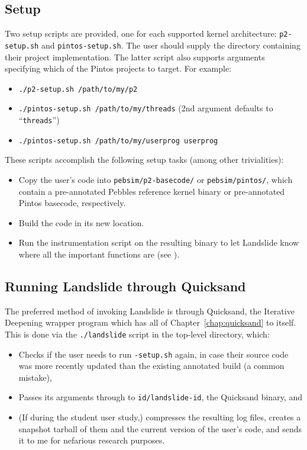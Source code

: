 
\subsection{Setup}

Two setup scripts are provided, one for each supported kernel architecture: {\tt p2-setup.sh} and {\tt pintos-setup.sh}.
The user should supply the directory containing their project implementation.
The latter script also supports arguments specifying which of the Pintos projects to target.
For example:
\begin{itemize}
	\item {\tt ./p2-setup.sh /path/to/my/p2}
	\item {\tt ./pintos-setup.sh /path/to/my/threads} (2nd argument defaults to ``{\tt threads}'')
	\item {\tt ./pintos-setup.sh /path/to/my/userprog userprog}
\end{itemize}

These scripts accomplish the following setup tasks (among other trivialities):
\begin{itemize}
	\item Copy the user's code into {\tt pebsim/p2-basecode/} or {\tt pebsim/pintos/},
		which contain a pre-annotated Pebbles reference kernel binary or pre-annotated Pintos basecode, respectively.
	\item Build the code in its new location.
	\item Run the instrumentation script on the resulting binary to let Landslide know where all the important functions are
		(see \sect{\ref{sec:landslide-glue}}).
\end{itemize}


\subsection{Running Landslide through Quicksand}
\label{sec:landslide-quicksand-options}

The preferred method of invoking Landslide is through Quicksand, the Iterative Deepening wrapper program which has all of Chapter~\ref{chap:quicksand} to itself.
This is done via the {\tt ./landslide} script in the top-level directory, which:
\begin{itemize}
	\item Checks if the user needs to run {\tt *-setup.sh} again, in case their source code was more recently updated than the existing annotated build (a common mistake),
	\item Passes its arguments through to {\tt id/landslide-id}, the Quicksand binary,
		and
	\item (If during the student user study,) compresses the resulting log files,
		creates a snapshot tarball of them and the current version of the user's code,
		and sends it to me for nefarious research purposes.
\end{itemize}


